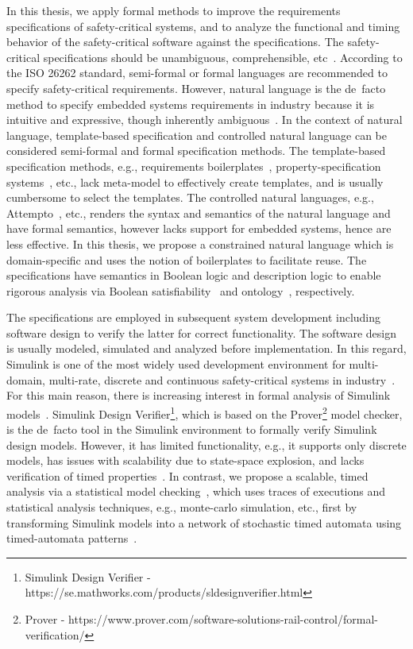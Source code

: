 In this thesis, we apply formal methods to improve the requirements specifications of safety-critical systems, and to analyze the functional and timing behavior of the safety-critical software against the specifications. The safety-critical  specifications should be unambiguous, comprehensible, etc~\cite{ieereqspecstandard}. According to the ISO 26262 standard, semi-formal or formal languages are recommended to specify safety-critical requirements. However, natural language is the de~facto method to specify embedded systems requirements in industry because it is intuitive and expressive, though inherently ambiguous~\cite{ieereqspecstandard}. In the context of natural language, template-based specification and controlled natural language can be considered semi-formal and formal specification methods. The template-based specification methods, e.g., requirements boilerplates~\cite{Hull2011RequirementsEngineering}, property-specification systems~\cite{Dwyer1999PatternsVerificationb}, etc., lack meta-model to effectively create templates, and is usually cumbersome to select the templates. The controlled natural languages, e.g., Attempto~\cite{attempto96}\cite{Fuchs2008AttemptoRepresentation}, etc., renders the syntax and semantics of the natural language and have formal semantics, however lacks support for embedded systems, hence are less effective. In this thesis, we propose a constrained natural language which is domain-specific and uses the notion of boilerplates to facilitate reuse. The specifications have semantics in Boolean logic and description logic to enable rigorous analysis via Boolean satisfiability~\cite{Malik2009BooleanSuccess} and ontology~\cite{f25ea3c6f4b743cd90c150926bbcf3db}, respectively.

The specifications are employed in subsequent system development including software design to verify the latter for correct functionality. The software design is usually modeled, simulated and analyzed before implementation. In this regard, Simulink is one of the most widely used development environment for multi-domain, multi-rate, discrete and continuous safety-critical systems in industry~\cite{JamesB.Dabney2003MasteringSimulink}. For this main reason, there is increasing interest in formal analysis of Simulink models~\cite{Manamcheri2011AModels}. Simulink Design Verifier\footnote{Simulink Design Verifier - https://se.mathworks.com/products/sldesignverifier.html}, which is based on the Prover\footnote{Prover - https://www.prover.com/software-solutions-rail-control/formal-verification/} model checker, is the de~facto tool in the Simulink environment to formally verify Simulink design models. However, it has limited functionality, e.g., it supports only discrete models, has issues with scalability due to state-space explosion, and lacks verification of timed properties~\cite{Leitner2008SimulinkStudy}.  In contrast, we propose a scalable, timed analysis via a statistical model checking~\cite{Legay2010StatisticalOverview}, which uses traces of executions and statistical analysis techniques, e.g., monte-carlo simulation, etc., first by transforming Simulink models into a network of stochastic timed automata using timed-automata patterns~\cite{Filipovikj2018SimppaalModels}.

